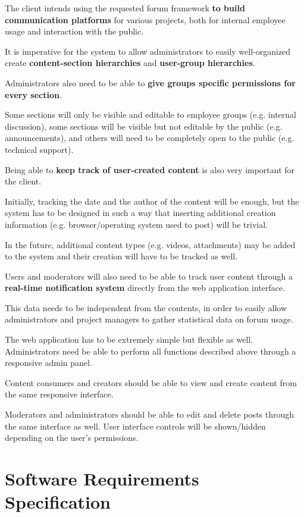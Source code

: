 \documentclass[12pt]{report}
\renewcommand\emph{\textbf}
\begin{document}
            The client intends using the requested forum framework \emph{to build communication platforms} for various projects, both for internal employee usage and interaction with the public.

            It is imperative for the system to allow administrators to easily well-organized create \emph{content-section hierarchies} and \emph{user-group hierarchies}.

            Administrators also need to be able to \emph{give groups specific permissions for every section}.

            Some sections will only be visible and editable to employee groups (e.g. internal discussion), some sections will be visible but not editable by the public (e.g. announcements), and others will need to be completely open to the public (e.g. technical support).

            Being able to \emph{keep track of user-created content} is also very important for the client.

            Initially, tracking the date and the author of the content will be enough, but the system has to be designed in such a way that inserting additional creation information (e.g. browser/operating system used to post) will be trivial.

            In the future, additional content types (e.g. videos, attachments) may be added to the system and their creation will have to be tracked as well.

            Users and moderators will also need to be able to track user content through a \emph{real-time notification system} directly from the web application interface.

            This data needs to be independent from the contents, in order to easily allow administrators and project managers to gather statistical data on forum usage.

            The web application has to be extremely simple but flexible as well. Administrators need be able to perform all functions described above through a responsive admin panel.

            Content consumers and creators should be able to view and create content from the same responsive interface.

            Moderators and administrators should be able to edit and delete posts through the same interface as well. User interface controls will be shown/hidden depending on the user’s permissions.

        \chapter{Software Requirements Specification}
\end{document}
